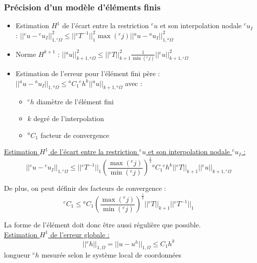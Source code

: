 \documentclass[../main.tex]{subfiles}
\begin{document}
\subsubsection{Précision d'un modèle d'éléments finis}
\begin{itemize}
    \item Estimation $H^1$ de l'écart entre la restriction ${}^eu$ et son interpolation nodale ${}^eu_I$ : $\lvert \lvert {}^eu-{}^eu_I\rvert \rvert^2_{1, {}^e\Omega} \leq \lvert \lvert {}^eT^{-1}\rvert \rvert_1^2 \max({}^ej) \lvert \lvert {}^au-{}^au_I\rvert \rvert^2_{1,{}^a\Omega}$\\
    \item Norme $H^{k+1}$ : $\lvert \lvert {}^au\rvert \rvert^2_{k+1, {}^a\Omega}\leq \lvert \lvert {}^eT\rvert\rvert^2_{k+1} \frac{1}{\min({}^ej)} \lvert \lvert {}^eu\rvert \rvert^2_{k+1, {}^e\Omega}$\\
    \item Estimation de l'erreur pour l'élément fini père : $\lvert \lvert {}^au-{}^au_I\rvert \rvert_{1,{}^a\Omega} \leq {}^aC_1 {}^eh^k \lvert \lvert {}^au\rvert \rvert_{k+1, {}^a\Omega}$ avec : \begin{itemize}
        \item ${}^eh$ diamètre de l'élément fini\\
        \item $k$ degré de l'interpolation\\
        \item ${}^aC_1$ facteur de convergence\\
    \end{itemize}
\end{itemize}

\quad \underline{Estimation $H^1$ de l'écart entre la restriction ${}^eu$ et son interpolation nodale ${}^eu_I$ :} \begin{equation}
    \lvert \lvert {}^eu-{}^eu_I\rvert \rvert_{1, {}^e\Omega} \leq \lvert \lvert {}^eT^{-1} \rvert \rvert_1 (\frac{\max({}^ej)}{\min({}^ej)})^\frac{1}{2} {}^aC_1 {}^eh^k \lvert \lvert {}^eT\rvert \rvert_{k+1} \lvert \lvert {}^eu\rvert \rvert_{k+1, {}^e\Omega}
\end{equation}

De plus, on peut définir des facteurs de convergence : \begin{equation}
    {}^eC_1 \leq {}^aC_1 (\frac{\max({}^ej)}{\min({}^ej)})^\frac{1}{2} \lvert \lvert {}^eT\rvert \rvert_{k+1} \lvert \lvert {}^eT^{-1}\rvert \rvert_{1}
\end{equation}

La forme de l'élément doit donc être aussi régulière que possible. \\

\quad \underline{Estimation $H^1$ de l'erreur globale :}\\
\begin{equation}
    \lvert \lvert {}^eh\rvert \rvert_{1, \Omega} = \lvert \lvert u-u^h\rvert \rvert_{1, \Omega} \leq C_1 h^k
\end{equation}
\warning longueur ${}^eh$ mesurée selon le système local de coordonnées\\
\end{document}
